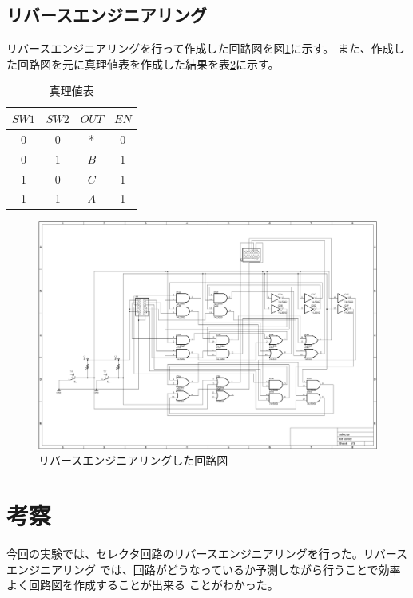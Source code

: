 \documentclass[a4paper,11pt,dvipdfmx]{jsarticle}
\begin{document}
\begin{table}[H]
\begin{tabular}{|c|c|c|c|c|}
\begin{minipage}{0.15\columnwidth}
    \end{minipage} \\
    \hline
  \end{tabular}
  \label{tab:selector1}
\end{table}

\subsection{リバースエンジニアリング}
リバースエンジニアリングを行って作成した回路図を図\ref{fig:reverse}に示す。
また、作成した回路図を元に真理値表を作成した結果を表\ref{tab:a}に示す。
\begin{table}[H]
  \centering
  \caption{真理値表}
  \begin{tabular}{|cc|cc|}
    \hline
    $SW1$  & $SW2$  &  $OUT$ & $EN$\\
    \hline
    0 & 0 &* & 0 \\
    0 & 1 &$B$ &1 \\
    1 & 0 &$C$ &1 \\
    1 & 1 &$A$ &1 \\
    \hline
  \end{tabular}
  \label{tab:a}
\end{table}

\begin{figure}[H]
  \centering
  \includegraphics[angle = 90 , width =0.9\columnwidth]{./images/circuit.png}
  \caption{リバースエンジニアリングした回路図}
  \label{fig:reverse}
\end{figure}

\section{考察}
今回の実験では、セレクタ回路のリバースエンジニアリングを行った。リバースエンジニアリング
では、回路がどうなっているか予測しながら行うことで効率よく回路図を作成することが出来る
ことがわかった。
\end{document}
